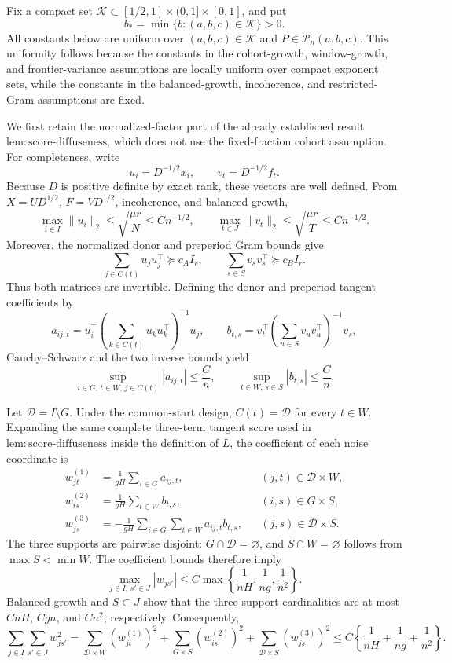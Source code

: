 Fix a compact set \(\mathcal K\subset[1/2,1]\times(0,1]\times[0,1]\), and put
\[
 b_*=\min\{b:(a,b,c)\in\mathcal K\}>0.
\]
All constants below are uniform over \((a,b,c)\in\mathcal K\) and \(P\in\mathcal P_n(a,b,c)\).  This uniformity follows because the constants in the cohort-growth, window-growth, and frontier-variance assumptions are locally uniform over compact exponent sets, while the constants in the balanced-growth, incoherence, and restricted-Gram assumptions are fixed.

We first retain the normalized-factor part of the already established result \(\mathrm{lem:score\mbox{-}diffuseness}\), which does not use the fixed-fraction cohort assumption.  For completeness, write
\[
 u_i=D^{-1/2}x_i,
 \qquad
 v_t=D^{-1/2}f_t.
\]
Because \(D\) is positive definite by exact rank, these vectors are well defined.  From \(X=UD^{1/2}\), \(F=VD^{1/2}\), incoherence, and balanced growth,
\[
 \max_{i\in I}\lVert u_i\rVert_2
 \le \sqrt{\frac{\mu r}{N}}
 \le Cn^{-1/2},
 \qquad
 \max_{t\in J}\lVert v_t\rVert_2
 \le \sqrt{\frac{\mu r}{T}}
 \le Cn^{-1/2}.
\]
Moreover, the normalized donor and preperiod Gram bounds give
\[
 \sum_{j\in C(t)}u_ju_j^{\top}\succeq c_AI_r,
 \qquad
 \sum_{s\in S}v_sv_s^{\top}\succeq c_BI_r.
\]
Thus both matrices are invertible.  Defining the donor and preperiod tangent coefficients by
\[
 a_{ij,t}
 =u_i^{\top}\!\left(\sum_{k\in C(t)}u_ku_k^{\top}\right)^{-1}u_j,
 \qquad
 b_{t,s}
 =v_t^{\top}\!\left(\sum_{u\in S}v_uv_u^{\top}\right)^{-1}v_s,
\]
Cauchy--Schwarz and the two inverse bounds yield
\[
 \sup_{i\in G,\,t\in W,\,j\in C(t)}|a_{ij,t}|\le \frac{C}{n},
 \qquad
 \sup_{t\in W,\,s\in S}|b_{t,s}|\le \frac{C}{n}.
\]

Let \(\mathcal D=I\setminus G\).  Under the common-start design, \(C(t)=\mathcal D\) for every \(t\in W\).  Expanding the same complete three-term tangent score used in \(\mathrm{lem:score\mbox{-}diffuseness}\) inside the definition of \(L\), the coefficient of each noise coordinate is
\[
 \begin{aligned}
 w^{(1)}_{jt}
 &=\frac{1}{gH}\sum_{i\in G}a_{ij,t},
 &&(j,t)\in\mathcal D\times W,\\
 w^{(2)}_{is}
 &=\frac{1}{gH}\sum_{t\in W}b_{t,s},
 &&(i,s)\in G\times S,\\
 w^{(3)}_{js}
 &=-\frac{1}{gH}\sum_{i\in G}\sum_{t\in W}a_{ij,t}b_{t,s},
 &&(j,s)\in\mathcal D\times S.
 \end{aligned}
\]
The three supports are pairwise disjoint: \(G\cap\mathcal D=\varnothing\), and \(S\cap W=\varnothing\) follows from \(\max S<\min W\).  The coefficient bounds therefore imply
\[
 \max_{j\in I,\,s'\in J}|w_{js'}|
 \le C\max\left\{\frac{1}{nH},\frac{1}{ng},\frac{1}{n^2}\right\}.
\]
Balanced growth and \(S\subset J\) show that the three support cardinalities are at most \(CnH\), \(Cgn\), and \(Cn^2\), respectively.  Consequently,
\[
 \sum_{j\in I}\sum_{s'\in J}w_{js'}^2
 =\sum_{\mathcal D\times W}(w^{(1)}_{jt})^2
  +\sum_{G\times S}(w^{(2)}_{is})^2
  +\sum_{\mathcal D\times S}(w^{(3)}_{js})^2
 \le C\left\{\frac{1}{nH}+\frac{1}{ng}+\frac{1}{n^2}\right\}.
\]

